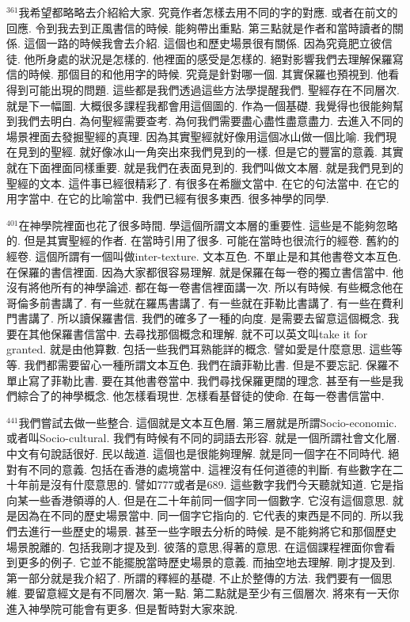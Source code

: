 \documentclass{book}
\begin{document}
$^{361}$我希望都略略去介紹給大家.
究竟作者怎樣去用不同的字的對應.
或者在前文的回應.
令到我去到正風書信的時候.
能夠帶出重點.
第三點就是作者和當時讀者的關係.
這個一路的時候我會去介紹.
這個也和歷史場景很有關係.
因為究竟肥立彼信徒.
他所身處的狀況是怎樣的.
他裡面的感受是怎樣的.
絕對影響我們去理解保羅寫信的時候.
那個目的和他用字的時候.
究竟是針對哪一個.
其實保羅也預視到.
他看得到可能出現的問題.
這些都是我們透過這些方法學提醒我們.
聖經存在不同層次.
就是下一幅圖.
大概很多課程我都會用這個圖的.
作為一個基礎.
我覺得也很能夠幫到我們去明白.
為何聖經需要查考.
為何我們需要盡心盡性盡意盡力.
去進入不同的場景裡面去發掘聖經的真理.
因為其實聖經就好像用這個冰山做一個比喻.
我們現在見到的聖經.
就好像冰山一角突出來我們見到的一樣.
但是它的豐富的意義.
其實就在下面裡面同樣重要.
就是我們在表面見到的.
我們叫做文本層.
就是我們見到的聖經的文本.
這件事已經很精彩了.
有很多在希臘文當中.
在它的句法當中.
在它的用字當中.
在它的比喻當中.
我們已經有很多東西.
很多神學的同學.

$^{401}$在神學院裡面也花了很多時間.
學這個所謂文本層的重要性.
這些是不能夠忽略的.
但是其實聖經的作者.
在當時引用了很多.
可能在當時也很流行的經卷.
舊約的經卷.
這個所謂有一個叫做inter-texture.
文本互色.
不單止是和其他書卷文本互色.
在保羅的書信裡面.
因為大家都很容易理解.
就是保羅在每一卷的獨立書信當中.
他沒有將他所有的神學論述.
都在每一卷書信裡面講一次.
所以有時候.
有些概念他在哥倫多前書講了.
有一些就在羅馬書講了.
有一些就在菲勒比書講了.
有一些在費利門書講了.
所以讀保羅書信.
我們的確多了一種的向度.
是需要去留意這個概念.
我要在其他保羅書信當中.
去尋找那個概念和理解.
就不可以英文叫take it for granted.
就是由他算數.
包括一些我們耳熟能詳的概念.
譬如愛是什麼意思.
這些等等.
我們都需要留心一種所謂文本互色.
我們在讀菲勒比書.
但是不要忘記.
保羅不單止寫了菲勒比書.
要在其他書卷當中.
我們尋找保羅更闊的理念.
甚至有一些是我們綜合了的神學概念.
他怎樣看現世.
怎樣看基督徒的使命.
在每一卷書信當中.

$^{441}$我們嘗試去做一些整合.
這個就是文本互色層.
第三層就是所謂Socio-economic.
或者叫Socio-cultural.
我們有時候有不同的詞語去形容.
就是一個所謂社會文化層.
中文有句說話很好.
民以哉道.
這個也是很能夠理解.
就是同一個字在不同時代.
絕對有不同的意義.
包括在香港的處境當中.
這裡沒有任何道德的判斷.
有些數字在二十年前是沒有什麼意思的.
譬如777或者是689.
這些數字我們今天聽就知道.
它是指向某一些香港領導的人.
但是在二十年前同一個字同一個數字.
它沒有這個意思.
就是因為在不同的歷史場景當中.
同一個字它指向的.
它代表的東西是不同的.
所以我們去進行一些歷史的場景.
甚至一些字眼去分析的時候.
是不能夠將它和那個歷史場景脫離的.
包括我剛才提及到.
彼落的意思,得著的意思.
在這個課程裡面你會看到更多的例子.
它並不能擺脫當時歷史場景的意義.
而抽空地去理解.
剛才提及到.
第一部分就是我介紹了.
所謂的釋經的基礎.
不止於整傳的方法.
我們要有一個思維.
要留意經文是有不同層次.
第一點.
第二點就是至少有三個層次.
將來有一天你進入神學院可能會有更多.
但是暫時對大家來說.
\end{document}
